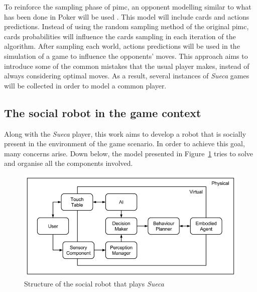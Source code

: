 To reinforce the sampling phase of \gls{pimc}, an opponent modelling similar to what has been done in Poker will be used \cite{Ponsen2008}.
This model will include cards and actions predictions.
Instead of using the random sampling method of the original \gls{pimc}, cards probabilities will influence the cards sampling in each iteration of the algorithm.
After sampling each world, actions predictions will be used in the simulation of a game to influence the opponents' moves.
This approach aims to introduce some of the common mistakes that the usual player makes, instead of always considering optimal moves.
As a result, several instances of \emph{Sueca} games will be collected in order to model a common player.


\subsection{The social robot in the game context}
\label{sec:social_solution}

Along with the \emph{Sueca} player, this work aims to develop a robot that is socially present in the environment of the game scenario.
In order to achieve this goal, many concerns arise.
Down below, the model presented in Figure~\ref{fig:model} tries to solve and organise all the components involved.

\begin{figure}[ht]
  \centering
    \includegraphics[width=1\textwidth]{./img/model}
  \caption{Structure of the social robot that plays \emph{Sueca}}
\label{fig:model}
\end{figure}

